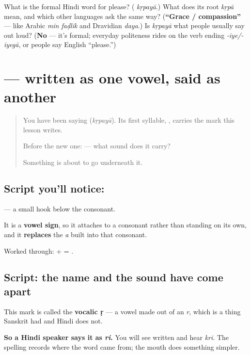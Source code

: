 \begin{tcolorbox}[breakable,colback=teal!4,colframe=teal!35!black,title={Before you move on}]
What is the formal Hindi word for please? (\textbf{} \emph{kṛpayā}.) What does its root \emph{kṛpā} mean, and which other languages ask the same way? (\textbf{\textquotedblleft{}Grace / compassion\textquotedblright{}} — like Arabic \emph{min faḍlik} and Dravidian \emph{daya}.) Is \emph{kṛpayā} what people usually say out loud? (\textbf{No} — it's formal; everyday politeness rides on the verb ending \emph{-iye/-iyegā}, or people say English \textquotedblleft{}please.\textquotedblright{})
\end{tcolorbox}
\section[\texorpdfstring{\hi{ृ} (ṛ)}{ृ (ṛ)}]{ — written as one vowel, said as another}

\label{lesson:HI-S144-vowel-sign-vocalic-r}



\begin{quote}
You have been saying \textbf{} (\emph{kṛpayā}). Its first syllable, \textbf{}, carries the mark this lesson writes.

Before the new one: \textbf{} — what sound does it carry?

Something is about to go underneath it.
\end{quote}

\subsection*{Script you'll notice: }
\textbf{} — a small hook below the consonant.

It is a \textbf{vowel sign}, so it attaches to a consonant rather than standing on its own, and it \textbf{replaces} the \emph{a} built into that consonant.

Worked through: \textbf{} + \textbf{} = \textbf{}.

\subsection*{Script: the name and the sound have come apart}
This mark is called the \textbf{vocalic ṛ} — a vowel made out of an \emph{r}, which is a thing Sanskrit had and Hindi does not.

\textbf{So a Hindi speaker says it as \emph{ri}.} You will see \textbf{} written and hear \emph{kri}. The spelling records where the word came from; the mouth does something simpler.

